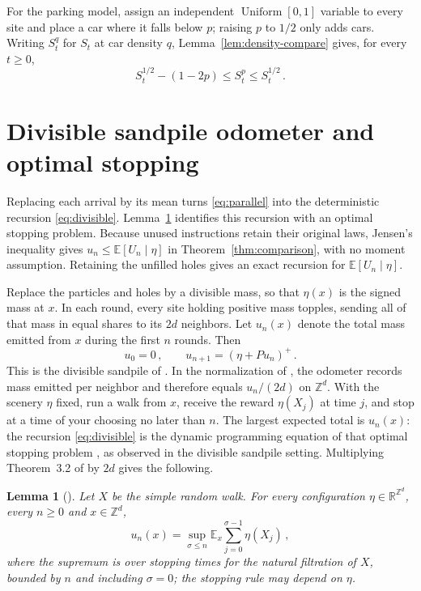 \documentclass[11pt]{amsart}
\theoremstyle{plain}
\newtheorem{lemma}[theorem]{Lemma}
\theoremstyle{definition}
\newcommand{\Z}{\mathbb{Z}}
\newcommand{\E}{\mathbb{E}}
\begin{document}
For the parking model, assign an independent $\operatorname{Uniform}[0,1]$ variable to every site and place
a car where it falls below $p$; raising $p$ to $1/2$ only adds cars. Writing
$S_t^q$ for $S_t$ at car density $q$,
Lemma~\ref{lem:density-compare} gives, for every $t\geq0$,
\begin{equation}\label{eq:parking-compare}
	S_t^{1/2}-(1-2p)\leq S_t^p\leq S_t^{1/2}\,.
\end{equation}

\section{Divisible sandpile odometer and optimal stopping}\label{sec:divisible}

Replacing each arrival by its mean turns \eqref{eq:parallel} into the
deterministic recursion \eqref{eq:divisible}. Lemma~\ref{lem:stopping}
identifies this recursion with an optimal stopping problem. Because unused
instructions retain their original laws, Jensen's inequality gives $u_n\leq\E[U_n\mid\eta]$ in
Theorem~\ref{thm:comparison}, with no moment assumption. Retaining the
unfilled holes gives an exact recursion for $\E[U_n\mid\eta]$.

Replace the particles and holes by a divisible mass, so that $\eta(x)$ is the
signed mass at $x$. In each round, every site holding positive mass topples,
sending all of that mass in equal shares to its $2d$ neighbors. Let $u_n(x)$ denote the total mass emitted from $x$ during the first $n$
rounds. Then
\begin{equation}\label{eq:divisible}
    u_0=0\,,\qquad u_{n+1}=(\eta+Pu_n)^+\,.
\end{equation} 
This is the divisible sandpile of \citet{LevinePeres09}. In the normalization of \citet{BPRS}, the
odometer records mass emitted per neighbor and therefore equals $u_n/(2d)$ on
$\Z^d$. With the scenery $\eta$ fixed, run a walk from $x$, receive the reward
$\eta(X_j)$ at time $j$, and stop at a time of your choosing no later than $n$.
The largest expected total is $u_n(x)$: the
recursion \eqref{eq:divisible} is the dynamic programming equation of that
optimal stopping problem \citep[Chapter~I]{PeskirShiryaev}, as \citet{BPRS}
observed in the divisible sandpile setting. Multiplying Theorem~3.2 of \citet{BPRS} by $2d$ gives the
following.

\begin{lemma}[{\citealp{BPRS}}]\label{lem:stopping}
	Let $X$ be the simple random walk. For every configuration $\eta\in\mathbb R^{\Z^d}$, every $n\geq0$ and $x\in\Z^d$,
	\begin{equation}\label{eq:stopping}
		u_n(x)=\sup_{\sigma\leq n}\E_x\sum_{j=0}^{\sigma-1}\eta(X_j)\,,
	\end{equation}
	where the supremum is over stopping times for the
	natural filtration of $X$, bounded by $n$ and including $\sigma=0$; the
	stopping rule may depend on $\eta$.
\end{lemma}
\end{document}
